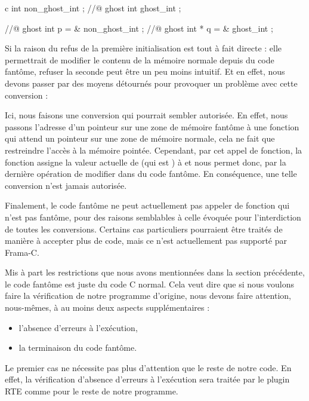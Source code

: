 \begin{CodeBlock}{c}
int non_ghost_int ;
//@ ghost int ghost_int ;

//@ ghost int \ghost * p = & non_ghost_int ;
//@ ghost int * q = & ghost_int ;
\end{CodeBlock}


Si la raison du refus de la première initialisation est tout à fait directe : elle
permettrait de modifier le contenu de la mémoire normale depuis du code fantôme,
refuser la seconde peut être un peu moins intuitif. Et en effet, nous devons passer
par des moyens détournés pour provoquer un problème avec cette conversion :




Ici, nous faisons une conversion qui pourrait sembler autorisée. En effet, nous
passons l'adresse d'un pointeur sur une zone de mémoire fantôme à une fonction qui
attend un pointeur sur une zone de mémoire normale, cela ne fait que restreindre
l'accès à la mémoire pointée. Cependant, par cet appel de fonction, la fonction
 assigne la valeur actuelle de  (qui est
) à  et nous permet donc, par la dernière opération
de modifier  dans du code fantôme. En conséquence, une telle
conversion n'est jamais autorisée.


Finalement, le code fantôme ne peut actuellement pas appeler de fonction qui
n'est pas fantôme, pour des raisons semblables à celle évoquée pour
l'interdiction de toutes les conversions. Certains cas particuliers pourraient
être traités de manière à accepter plus de code, mais ce n'est actuellement pas
supporté par Frama-C.


\label{l3:acsl-logic-definitions-what-remains}


Mis à part les restrictions que nous avons mentionnées dans la section précédente,
le code fantôme est juste du code C normal. Cela veut dire que si nous voulons
faire la vérification de notre programme d'origine, nous devons faire attention,
nous-mêmes, à au moins deux aspects supplémentaires :
\begin{itemize}
\item l'absence d'erreurs à l'exécution,
\item la terminaison du code fantôme.
\end{itemize}


Le premier cas ne nécessite pas plus d'attention que le reste de notre code.
En effet, la vérification d'absence d'erreurs à l'exécution sera traitée par
le plugin RTE comme pour le reste de notre programme.


